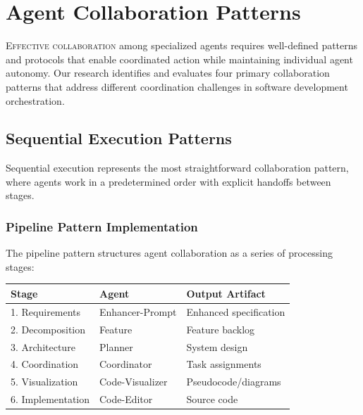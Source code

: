 
\section*{Agent Collaboration Patterns}

\lettrine{E}{ffective collaboration} among specialized agents requires well-defined patterns and protocols that enable coordinated action while maintaining individual agent autonomy. Our research identifies and evaluates four primary collaboration patterns that address different coordination challenges in software development orchestration.

\subsection*{Sequential Execution Patterns}

Sequential execution represents the most straightforward collaboration pattern, where agents work in a predetermined order with explicit handoffs between stages.

\subsubsection*{Pipeline Pattern Implementation}

The pipeline pattern structures agent collaboration as a series of processing stages:

\begin{center}
\begin{tabular}{@{}lll@{}}
\toprule
\textbf{Stage} & \textbf{Agent} & \textbf{Output Artifact} \\
\midrule
1. Requirements & Enhancer-Prompt & Enhanced specification \\
2. Decomposition & Feature & Feature backlog \\
3. Architecture & Planner & System design \\
4. Coordination & Coordinator & Task assignments \\
5. Visualization & Code-Visualizer & Pseudocode/diagrams \\
6. Implementation & Code-Editor & Source code \\
\bottomrule
\end{tabular}
\end{center}

